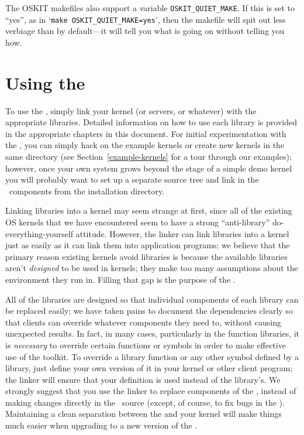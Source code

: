 The OSKIT makefiles also support a variable {\tt OSKIT_QUIET_MAKE}.
If this is set to ``yes'', as in `{\tt make OSKIT_QUIET_MAKE=yes}',
then the makefile will spit out less verbiage than by default---it
will tell you what is going on without telling you how. 

\section{Using the \oskit{}}
\label{using-oskit}

To use the \oskit{},
simply link your kernel (or servers, or whatever)
with the appropriate libraries.
Detailed information on how to use each library
is provided in the appropriate chapters in this document.
For initial experimentation with the \oskit,
you can simply hack on the example kernels
or create new kernels in the same directory
(see Section~\ref{example-kernels} for a tour through our examples);
however, once your own system grows beyond the stage of a simple demo kernel
you will probably want to set up a separate source tree
and link in the \oskit\ components from the installation directory.

Linking libraries into a kernel may seem strange at first,
since all of the existing OS kernels that we have encountered
seem to have a strong ``anti-library'' do-everything-yourself attitude.
However, the linker can link libraries into a kernel
just as easily as it can link them into application programs;
we believe that the primary reason existing kernels avoid libraries
is because the available libraries aren't \emph{designed} to be used in kernels;
they make too many assumptions about the environment they run in.
Filling that gap is the purpose of the \oskit{}.

All of the \oskit{} libraries are designed
so that individual components of each library can be replaced easily;
we have taken pains to document the dependencies clearly
so that clients can override whatever components they need to,
without causing unexpected results.
In fact, in many cases,
particularly in the function libraries,
it is \emph{necessary} to override certain functions or symbols
in order to make effective use of the toolkit.
To override a library function or any other symbol defined by a library,
just define your own version of it in your kernel or other client program;
the linker will ensure that your definition is used instead of the library's.
We strongly suggest that you use the linker
to replace components of the \oskit,
instead of making changes directly in the \oskit\ source
(except, of course, to fix bugs in the \oskit).
Maintaining a clean separation between the \oskit{} and your kernel
will make things much easier
when upgrading to a new version of the \oskit.


